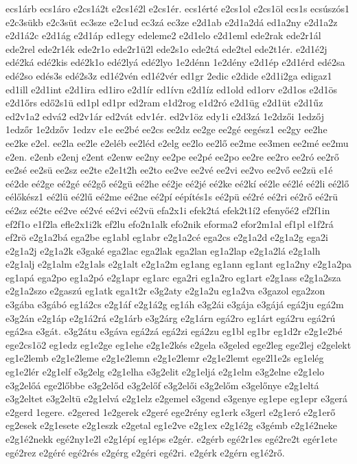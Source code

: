 {ecs1árb
ecs1áro
e2cs1á2t
e2cs1é2l
e2cs1ér.
ecs1érté
e2cs1ol
e2cs1öl
ecs1s
ecsúszós1
e2c3sükb
e2c3süt
ec3sze
e2c1ud
ec3zá
ec3ze
e2d1ab
e2d1a2dá
ed1a2ny
e2d1a2z
e2d1á2c
e2d1ág
e2d1áp
ed1egy
edeleme2
e2d1elo
e2d1eml
ede2rak
ede2r1ál
ede2rel
ede2r1ék
ede2r1o
ede2r1ü2l
ede2s1o
ede2tá
ede2tel
ede2t1ér.
e2d1é2j
edé2ká
edé2kis
edé2k1o
edé2lyá
edé2lyo
1e2dénn
1e2dény
e2d1ép
e2d1érd
edé2sa
edé2so
edés3s
edé2s3z
ed1é2vén
ed1é2vér
ed1gr
2edic
e2dide
e2d1i2ga
edigaz1
ed1ill
e2d1int
e2d1ira
ed1iro
e2d1ír
ed1ívn
e2d1íz
ed1old
ed1orv
e2d1os
e2d1ös
e2d1őrs
edő2s1ü
ed1pl
ed1pr
ed2ram
e1d2rog
e1d2ró
e2d1üg
e2d1üt
e2d1űz
ed2v1a2
edvá2
ed2v1ár
ed2vát
edv1ér.
ed2v1öz
edy1i
e2d3zá
1e2dzői
1edzőj
1edzőr
1e2dzőv
1edzv
e1e
ee2bé
ee2cs
ee2dz
ee2ge
ee2gé
eegész1
ee2gy
ee2he
ee2ke
e2el.
ee2la
ee2le
e2eléb
ee2léd
e2elg
ee2lo
ee2lő
ee2me
ee3men
ee2mé
ee2mu
e2en.
e2enb
e2enj
e2ent
e2enw
ee2ny
ee2pe
ee2pé
ee2po
ee2re
ee2ro
ee2ró
ee2rő
ee2sé
ee2sü
ee2sz
ee2te
e2e1t2h
ee2to
ee2ve
ee2vé
ee2vi
ee2vo
ee2vő
ee2zü
e1é
eé2de
eé2ge
eé2gé
eé2gő
eé2gü
eé2he
eé2je
eé2jé
eé2ke
eé2kí
eé2le
eé2lé
eé2li
eé2lő
eélőkész1
eé2lü
eé2lű
eé2me
eé2ne
eé2pí
eépítés1s
eé2pü
eé2ré
eé2ri
eé2rő
eé2rü
eé2sz
eé2te
eé2ve
eé2vé
eé2vi
eé2vü
efa2x1i
efek2tá
efek2t1í2
efenyőé2
ef2f1in
ef2f1o
e1f2la
efle2x1i2k
ef2lu
efo2n1alk
efo2nik
eforma2
efor2m1al
ef1pl
e1f2rá
ef2rö
e2g1a2bá
ega2be
eg1abl
eg1abr
e2g1a2cé
ega2cs
e2g1a2d
e2g1a2g
ega2i
e2g1a2j
e2g1a2k
e3gaké
ega2lac
ega2lak
ega2lan
eg1a2lap
e2g1a2lá
e2g1alh
e2g1alj
e2g1alm
e2g1als
e2g1alt
e2g1a2m
eg1ang
eg1ann
eg1ant
eg1a2ny
e2g1a2pa
eg1apá
ega2po
eg1a2pó
e2g1apr
eg1arc
ega2ri
eg1a2ro
eg1art
e2g1ass
e2g1a2sza
e2g1a2szo
e2gaszú
eg1atk
ega1t2r
e3g2aty
e2g1a2u
eg1a2va
e3gazol
ega2zon
e3gába
e3gábó
eg1á2cs
e2g1áf
e2g1á2g
eg1áh
e3g2ái
e3gája
e3gájá
egá2ju
egá2m
e3g2án
e2g1áp
e2g1á2rá
e2g1árb
e3g2árg
e2g1árn
egá2ro
eg1árt
egá2ru
egá2rú
egá2sa
e3gát.
e3g2átu
e3gáva
egá2zá
egá2zi
egá2zu
eg1bl
eg1br
eg1d2r
e2g1e2bé
ege2cs1ö2
eg1edz
eg1e2ge
eg1ehe
e2g1e2kés
e2gela
e3geled
ege2leg
ege2lej
e2gelekt
eg1e2lemb
e2g1e2leme
e2g1e2lemn
e2g1e2lemr
e2g1e2lemt
ege2l1e2s
eg1elég
eg1e2lér
e2g1elf
e3g2elg
e2g1elha
e3g2elit
e2g1eljá
e2g1elm
e3g2elne
e2g1elo
e3g2előá
ege2lőbbe
e3g2előd
e3g2előf
e3g2elői
e3g2előm
e3gelőnye
e2g1eltá
e3g2eltet
e3g2eltü
e2g1elvá
e2g1elz
e2gemel
e3gend
e3genye
eg1epe
eg1epr
e3gerá
e2gerd
1egere.
e2gered
1e2gerek
e2geré
ege2rény
eg1erk
e3gerl
e2g1eró
e2g1erő
eg2esek
e2g1esete
e2g1eszk
e2getal
eg1e2ve
e2g1ex
e2g1é2g
e3gémb
e2g1é2neke
e2g1é2nekk
egé2ny1e2l
e2g1épí
eg1éps
e2gér.
e2gérb
egé2r1es
egé2re2t
egér1ete
egé2rez
e2géré
egé2rés
e2gérg
e2géri
egé2ri.
e2gérk
e2gérn
eg1é2rő.
}
